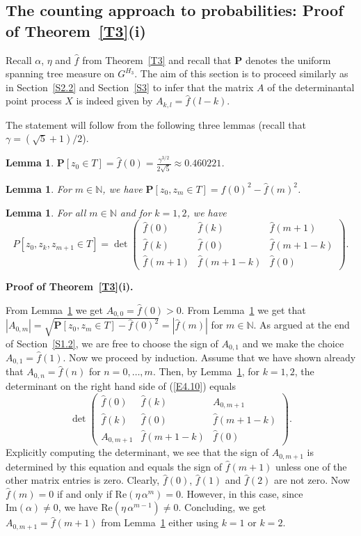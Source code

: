 \documentclass[11pt]{article}
\providecommand{\1}{\mathBB{1}}
\renewcommand{\P}{\mathbf{P}}
\newcommand{\N}{{\mathbb{N}}}
\def\hatf{\widehat f}
\newcommand{\equ}[1]{(\ref{#1})}
\newtheorem{lemma}[proposition]{Lemma}
\def\Re{\mathrm{Re}}
\def\Im{\mathrm{Im}}
\begin{document}
\subsection{The counting approach to probabilities: Proof of Theorem~\ref{T3}(i)}
\label{S4.2}
Recall $\alpha$, $\eta$ and $\hatf$ from Theorem~\ref{T3} and recall that $\P$ denotes the uniform spanning tree measure on $G^{H_3}$.
The aim of this section is to proceed similarly as in Section~\ref{S2.2} and Section~\ref{S3} to infer that the matrix $A$ of the determinantal point process $X$ is indeed given by $A_{k,l}=\hatf(l-k)$.

The statement will follow from the following three lemmas (recall that $\gamma=(\sqrt 5+1)/2$).
\begin{lemma}
\label{L4.2}
$\displaystyle \P[z_0\in T]=\hatf(0)=\frac{\gamma^{3/2}}{2\sqrt{5}}\approx0.460221$.
\end{lemma}
\begin{lemma}
\label{L4.3}
For $m\in\N$, we have
$\P[z_0,z_m\in T]=\hatf(0)^2-\hatf(m)^2$.
\end{lemma}
\begin{lemma}
\label{L4.4}For all $m\in\N$ and for $k=1,2$, we have
\begin{equation}
\label{E4.10}
P[z_0,z_k,z_{m+1}\in T]=
\det\left(
\begin{array}{ccc}
\hatf(0)           &\hatf(k)&\hatf(m+1)\\[1.5mm]
\hatf(k)    &       \hatf(0)&\hatf(m+1-k)    \\[1.5mm]
\hatf(m+1)&\hatf(m+1-k)&       \hatf(0)
\end{array}\right).
\end{equation}
\end{lemma}
\medskip

\textbf{Proof of Theorem~\ref{T3}(i).}\par
From Lemma~\ref{L4.2} we get $A_{0,0}=\hatf(0)>0$. From Lemma~\ref{L4.3} we get that
$|A_{0,m}|=\sqrt{\P[z_0,z_m\in T]-\hatf(0)^2}=|\hatf(m)|$ for $m\in \N$. As argued at the end of Section~\ref{S1.2}, we are free to choose the sign of $A_{0,1}$ and we make the choice $A_{0,1}=\hatf(1)$. Now we proceed by induction. Assume that we have shown already that $A_{0,n}=\hatf(n)$ for $n=0,\ldots,m$. Then, by Lemma~\ref{L4.4}, for $k=1,2$, the determinant on the right hand side of \equ{E4.10} equals
$$\det\left(
\begin{array}{ccc}
\hatf(0)           &\hatf(k)&A_{0,m+1}\\[1.5mm]
\hatf(k)    &       \hatf(0)&\hatf(m+1-k)    \\[1.5mm]
A_{0,m+1}&\hatf(m+1-k)&       \hatf(0)
\end{array}\right).
$$
Explicitly computing the determinant, we see that the sign of $A_{0,m+1}$ is determined by this equation and equals the sign of $\hatf(m+1)$ unless one of the other matrix entries is zero. Clearly, $\hatf(0)$, $\hatf(1)$ and $\hatf(2)$ are not zero. Now $\hatf(m)=0$ if and only if $\Re(\eta\,\alpha^m)=0$. However, in this case, since $\Im(\alpha)\neq0$, we have $\Re(\eta\,\alpha^{m-1})\neq0$. Concluding, we get $A_{0,m+1}=\hatf(m+1)$ from Lemma~\ref{L4.4} either using $k=1$ or $k=2$.
\end{document}
